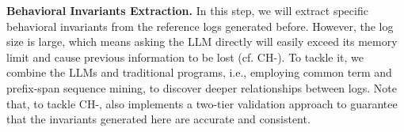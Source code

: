\noindent
{\bf Behavioral Invariants Extraction.} In this step, we will extract specific behavioral invariants from the reference logs generated before. However, the log size is large, which means asking the LLM directly will easily exceed its memory limit and cause previous information to be lost (cf. CH-). To tackle it, we combine the LLMs and traditional programs, i.e., employing common term and prefix-span sequence mining, to discover deeper relationships between logs. %
Note that, to tackle CH-, \tool also implements a two-tier validation approach to guarantee that the invariants generated here are accurate and consistent.








